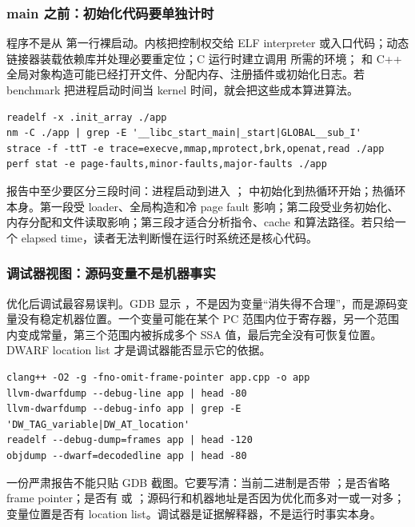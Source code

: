 \subsubsection{main 之前：初始化代码要单独计时}

程序不是从  第一行裸启动。内核把控制权交给 ELF interpreter 或入口代码；动态链接器装载依赖库并处理必要重定位；C 运行时建立调用  所需的环境； 和 C++ 全局对象构造可能已经打开文件、分配内存、注册插件或初始化日志。若 benchmark 把进程启动时间当 kernel 时间，就会把这些成本算进算法。

\begin{lstlisting}[numbers=none,caption={main 之前成本的观察入口}]
readelf -x .init_array ./app
nm -C ./app | grep -E '__libc_start_main|_start|GLOBAL__sub_I'
strace -f -ttT -e trace=execve,mmap,mprotect,brk,openat,read ./app
perf stat -e page-faults,minor-faults,major-faults ./app
\end{lstlisting}

报告中至少要区分三段时间：进程启动到进入 ； 中初始化到热循环开始；热循环本身。第一段受 loader、全局构造和冷 page fault 影响；第二段受业务初始化、内存分配和文件读取影响；第三段才适合分析指令、cache 和算法路径。若只给一个 elapsed time，读者无法判断慢在运行时系统还是核心代码。

\subsubsection{调试器视图：源码变量不是机器事实}

优化后调试最容易误判。GDB 显示 ，不是因为变量“消失得不合理”，而是源码变量没有稳定机器位置。一个变量可能在某个 PC 范围内位于寄存器，另一个范围内变成常量，第三个范围内被拆成多个 SSA 值，最后完全没有可恢复位置。DWARF location list 才是调试器能否显示它的依据。

\begin{lstlisting}[numbers=none,caption={调试器视图证据}]
clang++ -O2 -g -fno-omit-frame-pointer app.cpp -o app
llvm-dwarfdump --debug-line app | head -80
llvm-dwarfdump --debug-info app | grep -E 'DW_TAG_variable|DW_AT_location'
readelf --debug-dump=frames app | head -120
objdump --dwarf=decodedline app | head -80
\end{lstlisting}

一份严肃报告不能只贴 GDB 截图。它要写清：当前二进制是否带 ；是否省略 frame pointer；是否有  或 ；源码行和机器地址是否因为优化而多对一或一对多；变量位置是否有 location list。调试器是证据解释器，不是运行时事实本身。

